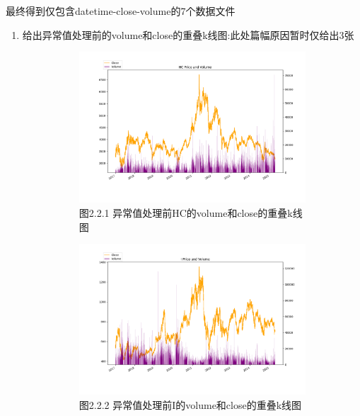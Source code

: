 \documentclass[a4paper,12pt]{ctexart}
\begin{document}
\iffalse
最终得到仅包含datetime-close-volume的7个数据文件
\begin{enumerate}
  \item 给出异常值处理前的volume和close的重叠k线图:此处篇幅原因暂时仅给出3张
\FloatBarrier
\noindent
\begin{figure}[H]
  \centering
  \begin{subfigure}[t]{0.4\textwidth}
    \includegraphics[width=\textwidth]{./v2/v0/HC.png}
    \caption*{图2.2.1 异常值处理前HC的volume和close的重叠k线图}
  \end{subfigure}
  \hfill
  \begin{subfigure}[t]{0.4\textwidth}
    \includegraphics[width=\textwidth]{./v2/v0/I.png}
    \caption*{图2.2.2 异常值处理前I的volume和close的重叠k线图}
  \end{subfigure}
  \hfill
  \begin{subfigure}[t]{0.4\textwidth}

\end{subfigure}
\end{figure}
\end{enumerate}
\end{document}
